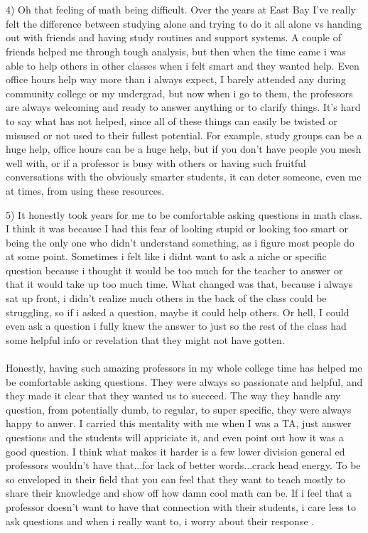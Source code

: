 \documentclass[10pt]{article}
\begin{document}
\begin{doublespacing}
\\\\
4) Oh that feeling of math being difficult. Over the years at East Bay I've really felt the difference
between studying alone and trying to do it all alone vs handing out with friends and having study
routines and support systems. A couple of friends helped me through tough analysis, but then when the time came
i was able to help others in other classes when i felt smart and they wanted help. Even office hours help
way more than i always expect, I barely attended any during community college or my undergrad,
but now when i go to them, the professors are always welcoming and ready to answer anything or to clarify things.
It's hard to say what has not helped, since all of these things can easily be twisted or misused or not used
to their fullest potential. For example, study groups can be a huge help, office hours can be a huge help, 
but if you don't have people you mesh well with, or if a professor is busy with others or having such fruitful 
conversations with the obviously smarter students, it can deter someone, even me at times, from using these resources.

\vspace{6cm}
5) It honestly took years for me to be comfortable asking questions in math class. 
I think it was because I had this fear of looking stupid or looking too smart or being the only one who 
didn't understand something, as i figure most people do at some point. Sometimes i felt like i didnt want to ask 
a niche or specific question because i thought it would be too much for the teacher to answer or that it would 
take up too much time. What changed was that, because i always sat up front, i didn't realize much others
in the back of the class could be struggling, so if i asked a question, maybe it could help others.
Or hell, I could even ask a question i fully knew the answer to just so the rest of the class had some
helpful info or revelation that they might not have gotten. 
\\\\
Honestly, having such amazing professors in my whole college time has helped me be comfortable asking questions. 
They were always so passionate and helpful, and they made it clear that they wanted us to succeed.
The way they handle any question, from potentially dumb, to regular, to super specific, 
they were always happy to anwer. I carried this mentality with me when I was a TA, just answer questions and
the students will appriciate it, and even point out how it was a good question. I think what makes it harder
is a few lower division general ed professors wouldn't have that...for lack of better words...crack head energy.
To be so enveloped in their field that you can feel that they want to teach mostly to share their knowledge
and show off how damn cool math can be. If i feel that a professor doesn't want to have that connection
with their students, i care less to ask questions and when i really want to, i worry about their response .

\end{doublespacing}
\end{document}
